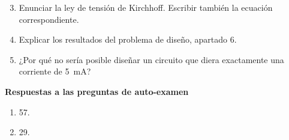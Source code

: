 \documentclass{article}
\begin{document}
\begin{enumerate}
    \setcounter{enumi}{2} %
    \item Enunciar la ley de tensión de Kirchhoff. Escribir también la ecuación correspondiente.
    
    \item Explicar los resultados del problema de diseño, apartado 6.
    
    \item ¿Por qué no sería posible diseñar un circuito que diera exactamente una corriente de \SI{5}{mA}?
\end{enumerate}

\vspace{2cm} %

\begin{flushleft}
    \textbf{Respuestas a las preguntas de auto-examen}
    
    \vspace{0.5cm}
    
    \begin{enumerate}
        \item 57.
        \item 29.
    \end{enumerate}
\end{flushleft}
\end{document}
